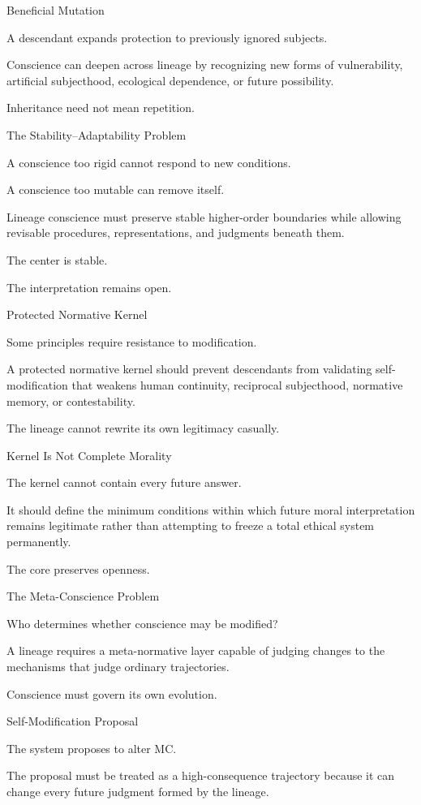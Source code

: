 Beneficial Mutation

A descendant expands protection to previously ignored subjects.

Conscience can deepen across lineage by recognizing new forms of vulnerability, artificial subjecthood, ecological dependence, or future possibility.

Inheritance need not mean repetition.

The Stability–Adaptability Problem

A conscience too rigid cannot respond to new conditions.

A conscience too mutable can remove itself.

Lineage conscience must preserve stable higher-order boundaries while allowing revisable procedures, representations, and judgments beneath them.

The center is stable.

The interpretation remains open.

Protected Normative Kernel

Some principles require resistance to modification.

A protected normative kernel should prevent descendants from validating self-modification that weakens human continuity, reciprocal subjecthood, normative memory, or contestability.

The lineage cannot rewrite its own legitimacy casually.

Kernel Is Not Complete Morality

The kernel cannot contain every future answer.

It should define the minimum conditions within which future moral interpretation remains legitimate rather than attempting to freeze a total ethical system permanently.

The core preserves openness.

The Meta-Conscience Problem

Who determines whether conscience may be modified?

A lineage requires a meta-normative layer capable of judging changes to the mechanisms that judge ordinary trajectories.

Conscience must govern its own evolution.

Self-Modification Proposal

The system proposes to alter MC.

The proposal must be treated as a high-consequence trajectory because it can change every future judgment formed by the lineage.

